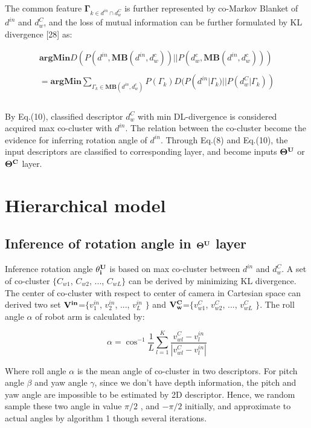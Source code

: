 \documentclass[journal]{IEEEtran}
\begin{document}
The common feature $\mathbf{\Gamma}_{k \in d^{in} \cap d^C_w}$ is further represented by co-Markov Blanket of $d^{in}$ and $d^C_w$, and the loss of mutual information can be further formulated by KL divergence [28] as:

\begin{equation}
\begin{array}{ll}
\mathbf{argMin}D(P(d^{in} , \mathbf{MB}(d^{in},d^c_w))||P(d^c_w , \mathbf{MB}(d^{in},d^c_w)))\\\\
= \mathbf{argMin}\sum_{\Gamma_k\in\mathbf{MB}(d^{in},d^c_w)}P(\Gamma_k)D(P(d^{in}|\Gamma_k)||P(d^C_w|\Gamma_k))\\\\
\end{array}
\end{equation}

By Eq.(10), classified descriptor $d^C_w$ with min DL-divergence is considered acquired max co-cluster with $d^{in}$. The relation between the co-cluster become the evidence for inferring rotation angle of $d^{in}$. Through Eq.(8) and Eq.(10), the input descriptors are classified to corresponding layer, and become inputs $\bf{\Theta^{U}}$ or $\bf{\Theta^{C}}$ layer.


\section{Hierarchical model}
\subsection{Inference of rotation angle in $\bf{\Theta^{U}}$ layer}
Inference rotation angle $\bf{\theta^{U}_i}$ is based on max co-cluster between $d^{in}$ and $d^C_w$. A set of co-cluster $\{$$C_{w1}$, $C_{w2}$, ..., $C_{wL}$$\}$ can be derived by minimizing KL divergence. The center of co-cluster with respect to center of camera in Cartesian space can derived two set $\bf{V^{in}}$=$\{$$v^{in}_1$, $v^{in}_2$, ..., $v^{in}_L$ $\}$ and $\bf{V^{C}_w}$=$\{$$v^{C}_{w1}$, $v^{C}_{w2}$, ..., $v^{C}_{wL}$ $\}$. The roll angle $\alpha$ of robot arm is calculated by:

\begin{equation}
\alpha =\cos^{-1}\frac{1}{L}\sum_{l=1}^K\frac{v^C_{wl}-v^{in}_l}{|v^C_{wl}-v^{in}_l|}
\end{equation}

Where roll angle $\alpha$ is the mean angle of co-cluster in two descriptors. For  pitch angle $\beta$ and yaw angle $\gamma$, since we don't have depth information, the pitch and yaw angle are impossible to be estimated by 2D descriptor. Hence, we random sample these two angle in value $\pi/2$ , and $-\pi/2$ initially, and approximate to actual angles by algorithm 1 though several iterations.
\end{document}
